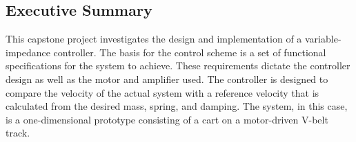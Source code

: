\subsection*{Executive Summary}

This capstone project investigates the design and implementation of a variable-impedance controller. The basis for the control scheme is a set of functional specifications for the system to achieve. These requirements dictate the controller design as well as the motor and amplifier used. The controller is designed to compare the velocity of the actual system with a reference velocity that is calculated from the desired mass, spring, and damping.  The system, in this case, is a one-dimensional prototype consisting of a cart on a motor-driven V-belt track.